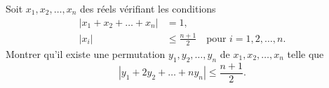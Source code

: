Soit $x_1, x_2, \dots, x_n$ des réels vérifiant les conditions
\[ \begin{aligned} |x_1 + x_2 + \dots + x_n| &= 1, \\ |x_i| &\le \frac{n+1}{2} \quad \text{pour } i = 1, 2, \dots, n. \end{aligned} \]
Montrer qu'il existe une permutation $y_1, y_2, \dots, y_n$ de $x_1, x_2, \dots, x_n$ telle que
\[ |y_1 + 2y_2 + \dots + n y_n| \le \frac{n+1}{2}. \]
